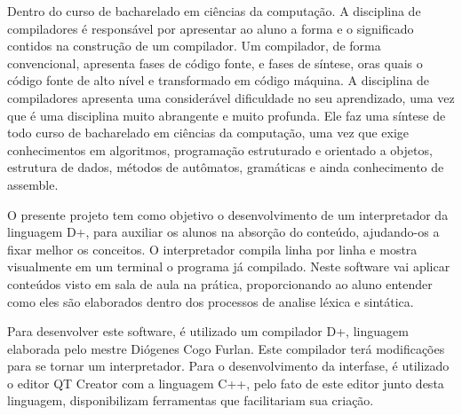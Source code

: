 \documentclass[12pt,oneside,a4paper,chapter=TITLE,section=TITLE,sumario=tradicional]{abntex2}
\begin{document}
Dentro do curso de bacharelado em ciências da computação. A disciplina de compiladores é responsável por apresentar ao aluno a forma e o significado contidos na construção de um compilador. Um compilador, de forma convencional, apresenta fases de código fonte, e fases de síntese, oras quais o código fonte de alto nível e transformado em código máquina. A disciplina de compiladores apresenta uma considerável dificuldade no seu aprendizado, uma vez que é uma disciplina muito abrangente e muito profunda. Ele faz uma síntese de todo curso de bacharelado em ciências da computação, uma vez que exige conhecimentos em algoritmos, programação estruturado e orientado a objetos, estrutura de dados, métodos de autômatos, gramáticas e ainda conhecimento de assemble. 

O presente projeto tem como objetivo o desenvolvimento de um interpretador da linguagem D+, para auxiliar os alunos na absorção do conteúdo, ajudando-os a fixar melhor os conceitos. O interpretador compila linha por linha e mostra visualmente em um terminal o programa já compilado. Neste software vai aplicar conteúdos visto em sala de aula na prática, proporcionando ao aluno entender como eles são elaborados dentro dos processos de analise léxica e sintática.

Para desenvolver este software, é utilizado um compilador D+, linguagem elaborada pelo mestre Diógenes Cogo Furlan. Este compilador terá modificações para se tornar um interpretador. Para o desenvolvimento da interfase, é utilizado o editor QT Creator com a linguagem C++, pelo fato de este editor junto desta linguagem, disponibilizam ferramentas que facilitariam sua criação.
\end{document}

